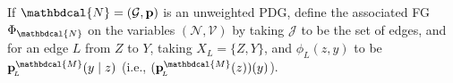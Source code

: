 \documentclass[letterpaper]{article} %
\theoremstyle{plain}
\theoremstyle{definition}
\theoremstyle{remark}
\newcommand\mat[1]{\mathbf{#1}}
\newcommand{\bp}[1][L]{\mat{p}_{\!_{#1}\!}}
\newcommand{\V}{\mathcal V}
\newcommand{\N}{\mathcal N}
\newcommand{\Ed}{\mathcal E}
\newcommand{\dg}[1]{\mathbdcal{#1}}
\newcommand{\WFGof}[1]{\Psi_{{#1}}}
\newcommand{\FGof}[1]{\Phi_{{#1}}}
\newcommand{\Gr}{\mathcal G}
\newcommand{\varsNV}[1][\N,\V]{(#1)}
\begin{document}
\begin{defn}\label{def:PDG2fg}
If $\dg N = (\Gr, \mat p)$ is an unweighted PDG, define   
the associated FG $\FGof{\dg N}$ on the 
variables $\varsNV$ by
taking $\mathcal J$ to be the set of edges, 
and for an edge $L$ from $Z$ to $Y$, taking $X_{L} = \{Z,Y\}$, and $\phi_L(z,y)$ to be
$\bp^{\dg M}(y \mid z)$ (i.e., $(\bp^{\dg M}(z))(y)$).
\end{defn}
\end{document}
